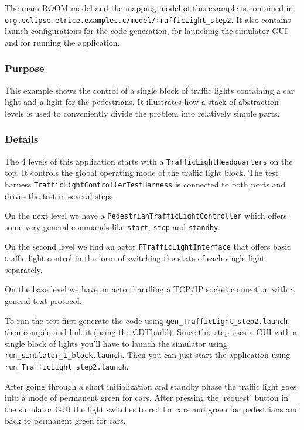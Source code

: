 The main ROOM model and the mapping model of this example is contained
in \texttt{org.eclipse.etrice.examples.c/model/TrafficLight\_step2}.
It also contains launch configurations for the code generation, for
launching the simulator GUI and for
running the application.

\subsubsection{Purpose}

This example shows the control of a single block of traffic lights
containing a car light and a light for the pedestrians.
It illustrates how a stack of abstraction levels is used to conveniently
divide the problem into relatively simple parts.

\subsubsection{Details}

The 4 levels of this application starts with a
\texttt{TrafficLightHeadquarters} on the
top. It controls the global operating mode of the traffic light block.
The test harness \texttt{TrafficLightControllerTestHarness} is connected to
both ports and drives the test in several steps.

On the next level we have a \texttt{PedestrianTrafficLightController} which
offers some very general commands like \texttt{start}, \texttt{stop} and \texttt{standby}.

On the second level we find an actor \texttt{PTrafficLightInterface}
that offers basic traffic light control in the form of switching the state
of each single light separately.

On the base level we have an actor handling a TCP/IP socket
connection with a general text protocol.

To run the test first generate the code using \texttt{gen\_TrafficLight\_step2.launch},
then compile and link it (using the CDTbuild). Since this step uses a GUI with a
single block of lights
you'll have to launch the simulator using \texttt{run\_simulator\_1\_block.launch}.
Then you can just start the application using \texttt{run\_TrafficLight\_step2.launch}.

After going through a short initialization and standby phase the traffic
light goes into a mode of permanent green for cars.
After pressing the 'request' button in the simulator GUI the light switches
to red for cars and green for pedestrians and back to permanent green for cars.

